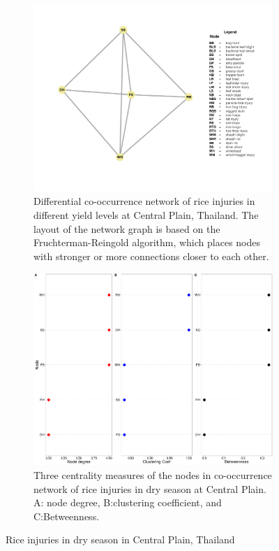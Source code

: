\begin{figure}
    \centering
    \begin{subfigure}[b]{1\textwidth}
        \includegraphics[width = 1\textwidth]{figures/difyieldOD.pdf}
        \caption{Differential co-occurrence network of rice injuries in different yield levels at Central Plain, Thailand. The layout of the network graph is based on the Fruchterman-Reingold algorithm, which places nodes with stronger or more connections closer to each other.}
        \label{fig:difyieldOD}
    \end{subfigure}
    \begin{subfigure}[b]{1\textwidth}
        \includegraphics[width = 1\textwidth]{figures/yield_dif_nodepropOdisha.pdf}
        \caption{Three centrality measures of the nodes in co-occurrence network of rice injuries in dry season at Central Plain. A: node degree, B:clustering coefficient, and C:Betweenness.}
        \label{fig:nodepropdifyield_OD}
    \end{subfigure}
    \caption{Rice injuries in dry season in Central Plain, Thailand}
    \label{fig:difyieldOD}
\end{figure}
 
